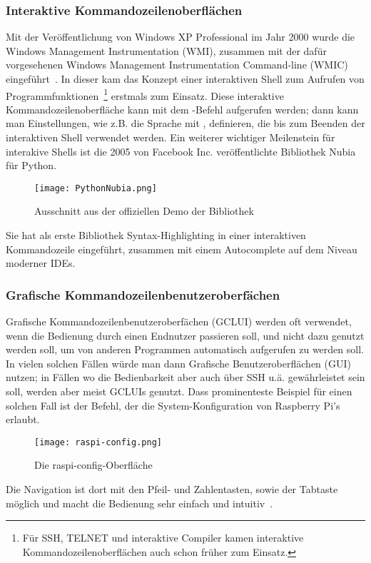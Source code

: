 \subsubsection{Interaktive Kommandozeilenoberflächen}
Mit der Veröffentlichung von Windows XP Professional im Jahr 2000 wurde die Windows Management Instrumentation (WMI),
zusammen mit der dafür vorgesehenen Windows Management Instrumentation Command-line (WMIC) eingeführt~\cite{WMIProgrammingBlogPost}.
In dieser kam das Konzept einer interaktiven Shell zum Aufrufen von
Programmfunktionen~\footnote{Für SSH, TELNET und interaktive Compiler kamen interaktive Kommandozeilenoberflächen auch schon früher zum Einsatz.} erstmals zum Einsatz.
Diese interaktive Kommandozeilenoberfläche kann mit dem -Befehl aufgerufen werden; %
dann kann man Einstellungen, wie
z.B. die Sprache mit , definieren, die bis zum Beenden der interaktiven Shell verwendet werden.
Ein weiterer wichtiger Meilenstein für interakive Shells ist die 2005 von Facebook Inc. veröffentlichte Bibliothek Nubia~\cite{NubiaReleaseBlogPost} für Python.
\begin{figure}[H]
 \texttt{[image: PythonNubia.png]}
 \caption{Ausschnitt aus der offiziellen Demo der Bibliothek}
 \label{fig:PythonNubia}
\end{figure}
Sie hat als erste Bibliothek Syntax-Highlighting in einer interaktiven Kommandozeile eingeführt, zusammen mit einem Autocomplete auf dem Niveau moderner IDEs.
\subsubsection{Grafische Kommandozeilenbenutzeroberfächen}
Grafische Kommandozeilenbenutzeroberfächen (GCLUI) werden oft verwendet, wenn die Bedienung durch einen Endnutzer passieren soll,
und nicht dazu genutzt werden soll, um von anderen Programmen automatisch aufgerufen zu werden soll.
In vielen solchen Fällen würde man dann Grafische Benutzeroberflächen (GUI) nutzen;
in Fällen wo die Bedienbarkeit aber auch über SSH u.ä. gewährleistet sein soll, werden aber meist GCLUIs genutzt.
Dass prominenteste Beispiel für einen solchen Fall ist der  Befehl, der die System-Konfiguration von Raspberry Pi's erlaubt.
\begin{figure}[H]
 \texttt{[image: raspi-config.png]}
 \caption{Die raspi-config-Oberfläche}
 \label{fig:raspi-config}
\end{figure}
Die Navigation ist dort mit den Pfeil- und Zahlentasten, sowie der Tabtaste möglich und macht die Bedienung sehr einfach und intuitiv~\cite{RaspiConfigOfficialInfo}.
